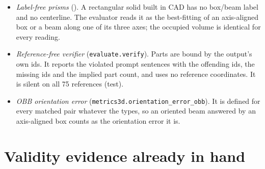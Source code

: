 \documentclass[10pt,a4paper]{article}
\newcommand{\file}[1]{\path{#1}}
\begin{document}
\begin{itemize}
\begin{itemize}
  \item \emph{Label-free prisms} (\file{prism.py}). A rectangular solid built in CAD has no box/beam label and no centerline. The evaluator reads it as the best-fitting of an axis-aligned box or a beam along one of its three axes; the occupied volume is identical for every reading.
  \item \emph{Reference-free verifier} (\texttt{evaluate.verify}). Parts are bound by the output's own ids. It reports the violated prompt sentences with the offending ids, the missing ids and the implied part count, and uses no reference coordinates. It is silent on all 75 references (test).
  \item \emph{OBB orientation error} (\texttt{metrics3d.orientation\_error\_obb}). It is defined for every matched pair whatever the types, so an oriented beam answered by an axis-aligned box counts as the orientation error it is.
  \end{itemize}
\end{itemize}

\section{Validity evidence already in hand}
\end{document}
